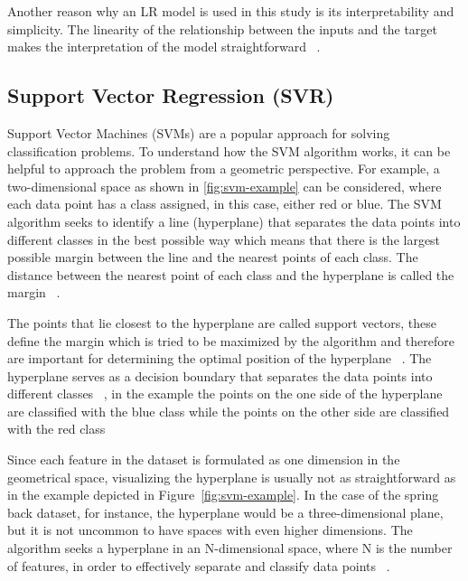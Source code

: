 Another reason why an \ac{LR} model is used in this study is its interpretability and simplicity.
The linearity of the relationship between the inputs and the target makes the
interpretation of the model straightforward
~\cite[p. 37]{molnar2020interpretable}.

\subsection{Support Vector Regression (SVR)}\label{subsec:support-vector-regression-(svr)}
Support Vector Machines (SVMs) are a popular approach for solving classification problems.
To understand how the SVM algorithm works, it can be helpful to approach the problem from a geometric perspective.
For example, a two-dimensional space as shown in \cref{fig:svm-example} can be considered, where each data point
has a class assigned, in this case, either red or blue.
The SVM algorithm seeks to identify a line (hyperplane) that separates the data points into different classes in the
best possible way which means that there is the largest possible margin between the line and the
nearest points of each class.
The distance between the nearest point of each class and the hyperplane is called the margin
~\cite[pp. 92--96]{muller_introductionmachinelearning_2016}.

The points that lie closest to the hyperplane are called support vectors, these define the margin which is tried to be
maximized by the algorithm and therefore are important for determining the optimal position of the hyperplane
~\cite[p. 42]{awad_efficientlearningmachines_2015}.
The hyperplane serves as a decision boundary that separates the data points into different
classes~\cite[p. 11]{awad_efficientlearningmachines_2015}
, in the example the points on the one side of the hyperplane are classified with the blue class while the
points on the other side are classified with the red class

Since each feature in the dataset is formulated as one dimension in the geometrical space, visualizing the hyperplane
is usually not as straightforward as in the example depicted in Figure~\ref{fig:svm-example}.
In the case of the spring back dataset, for instance, the hyperplane would be a three-dimensional plane, but it is
not uncommon to have spaces with even higher dimensions.
The algorithm seeks a hyperplane in an N-dimensional space, where N is the number of features, in order to
effectively separate and classify data points
~\cite[]{awad_efficientlearningmachines_2015}.

